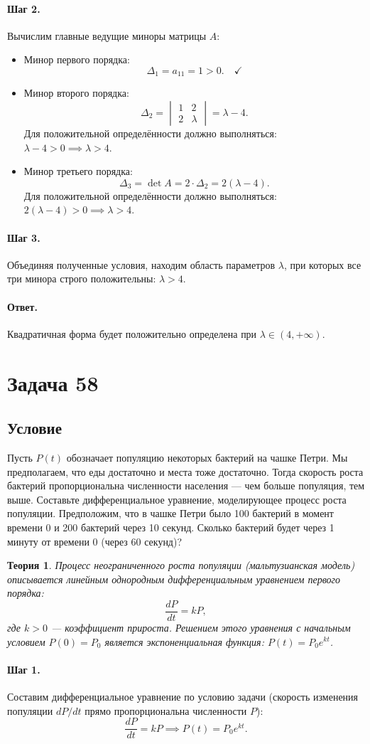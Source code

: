 \documentclass[12pt,a4paper]{article}
\theoremstyle{solution}
\newtheorem*{theory}{Теория}
\newcommand{\task}[1]{\newpage\section*{Задача #1}}
\newcommand{\answer}{\paragraph{Ответ.}}
\newcommand{\step}[1]{\paragraph{Шаг #1.}}
\begin{document}
\step{2} Вычислим главные ведущие миноры матрицы $A$:
\begin{itemize}
    \item Минор первого порядка:
    \[
    \Delta_1 = a_{11} = 1 > 0. \quad\checkmark
    \]
    \item Минор второго порядка:
    \[
    \Delta_2 = \begin{vmatrix} 1 & 2 \\ 2 & \lambda \end{vmatrix} = \lambda - 4.
    \]
    Для положительной определённости должно выполняться: $\lambda - 4 > 0 \implies \lambda > 4$.
    \item Минор третьего порядка:
    \[
    \Delta_3 = \det A = 2 \cdot \Delta_2 = 2(\lambda - 4).
    \]
    Для положительной определённости должно выполняться: $2(\lambda - 4) > 0 \implies \lambda > 4$.
\end{itemize}

\step{3} Объединяя полученные условия, находим область параметров $\lambda$, при которых все три минора строго положительны: $\lambda > 4$.

\answer
Квадратичная форма будет положительно определена при $\lambda \in (4, +\infty)$.

\task{58}
\subsection*{Условие}
Пусть $P(t)$ обозначает популяцию некоторых бактерий на чашке Петри. Мы предполагаем, что еды достаточно и места тоже достаточно. Тогда скорость роста бактерий пропорциональна численности населения — чем больше популяция, тем выше. Составьте дифференциальное уравнение, моделирующее процесс роста популяции.
Предположим, что в чашке Петри было 100 бактерий в момент времени 0 и 200 бактерий через 10 секунд. Сколько бактерий будет через 1 минуту от времени 0 (через 60 секунд)?

\begin{theory}
Процесс неограниченного роста популяции (мальтузианская модель) описывается линейным однородным дифференциальным уравнением первого порядка:
\[
\frac{dP}{dt} = k P,
\]
где $k > 0$ — коэффициент прироста. Решением этого уравнения с начальным условием $P(0) = P_0$ является экспоненциальная функция: $P(t) = P_0 e^{kt}$.
\end{theory}

\step{1} Составим дифференциальное уравнение по условию задачи (скорость изменения популяции $dP/dt$ прямо пропорциональна численности $P$):
\[
\frac{dP}{dt} = k P \implies P(t) = P_0 e^{kt}.
\]
\end{document}
